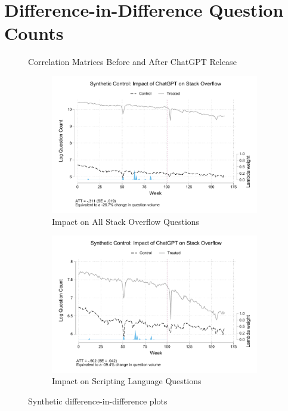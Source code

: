 \appendix

\section{Difference-in-Difference Question Counts}\label{app:did}

\begin{figure}[htpb!]
    \centering
    
    \caption{Correlation Matrices Before and After ChatGPT Release}
    \label{fig:app-correlation_matrix}
\end{figure}


\begin{figure}[htpb!]
    \centering
    \begin{subfigure}[b]{0.475\textwidth}
        \centering
        \includegraphics[width=1\textwidth]{imgs/stata/sdid_all_trends101.pdf}
        \caption{Impact on All Stack Overflow Questions}
        \label{fig:app-sdid_all}
    \end{subfigure}
    \hfill
    \begin{subfigure}[b]{0.475\textwidth}
        \centering
        \includegraphics[width=1\textwidth]{imgs/stata/sdid_script_trends101.pdf}
        \caption{Impact on Scripting Language Questions}
        \label{fig:app-sdid_script}
    \end{subfigure}
    \caption{Synthetic difference-in-difference plots}
    \label{fig:app-DiD}
\end{figure}

